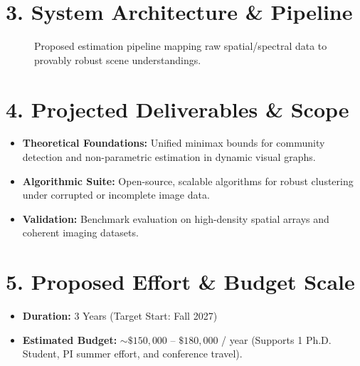 \documentclass[11pt,a4paper]{article}
\begin{document}
\section*{3. System Architecture \& Pipeline}
\begin{figure}[h!]
    \centering
    \caption{\small Proposed estimation pipeline mapping raw spatial/spectral data to provably robust scene understandings.}
\end{figure}

\vspace{-1em}

\section*{4. Projected Deliverables \& Scope}
\begin{itemize}
    \item \textbf{Theoretical Foundations:} Unified minimax bounds for community detection and non-parametric estimation in dynamic visual graphs.
    \item \textbf{Algorithmic Suite:} Open-source, scalable algorithms for robust clustering under corrupted or incomplete image data.
    \item \textbf{Validation:} Benchmark evaluation on high-density spatial arrays and coherent imaging datasets.
\end{itemize}

\section*{5. Proposed Effort \& Budget Scale}
\begin{itemize}
    \item \textbf{Duration:} 3 Years (Target Start: Fall 2027)
    \item \textbf{Estimated Budget:} $\sim \$150,000$ -- $\$180,000$ / year (Supports 1 Ph.D. Student, PI summer effort, and conference travel).
\end{itemize}
\end{document}
